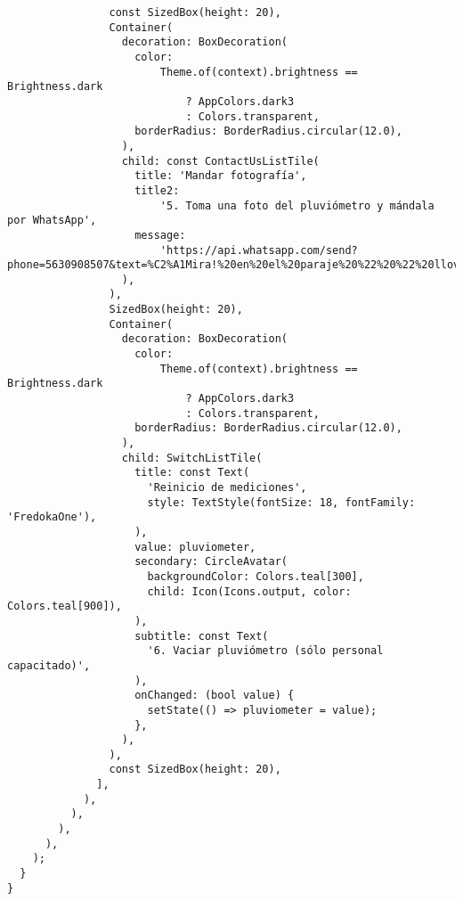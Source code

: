 \begin{verbatim}
                const SizedBox(height: 20),
                Container(
                  decoration: BoxDecoration(
                    color:
                        Theme.of(context).brightness == Brightness.dark
                            ? AppColors.dark3
                            : Colors.transparent,
                    borderRadius: BorderRadius.circular(12.0),
                  ),
                  child: const ContactUsListTile(
                    title: 'Mandar fotografía',
                    title2:
                        '5. Toma una foto del pluviómetro y mándala por WhatsApp',
                    message:
                        'https://api.whatsapp.com/send?phone=5630908507&text=%C2%A1Mira!%20en%20el%20paraje%20%22%20%22%20llovi%C3%B3%20%22%20%22mm,%20adjunto%20fotograf%C3%ADa%20del%20d%C3%ADa%20de%20hoy',
                  ),
                ),
                SizedBox(height: 20),
                Container(
                  decoration: BoxDecoration(
                    color:
                        Theme.of(context).brightness == Brightness.dark
                            ? AppColors.dark3
                            : Colors.transparent,
                    borderRadius: BorderRadius.circular(12.0),
                  ),
                  child: SwitchListTile(
                    title: const Text(
                      'Reinicio de mediciones',
                      style: TextStyle(fontSize: 18, fontFamily: 'FredokaOne'),
                    ),
                    value: pluviometer,
                    secondary: CircleAvatar(
                      backgroundColor: Colors.teal[300],
                      child: Icon(Icons.output, color: Colors.teal[900]),
                    ),
                    subtitle: const Text(
                      '6. Vaciar pluviómetro (sólo personal capacitado)',
                    ),
                    onChanged: (bool value) {
                      setState(() => pluviometer = value);
                    },
                  ),
                ),
                const SizedBox(height: 20),
              ],
            ),
          ),
        ),
      ),
    );
  }
}
\end{verbatim}



